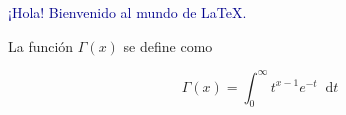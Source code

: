 \documentclass{article}
\newcommand*\diff{\mathop{}\!\mathrm{d}}
\begin{document}
\textcolor{DarkBlue}{¡Hola! Bienvenido al mundo de \LaTeX{}.}

\noindent
\begin{center}
La función $\Gamma(x)$ se define como
\end{center}

\[\boxed{\Gamma(x)=\int_{0}^{\infty}t^{x-1}e^{-t}\diff t}\]
\end{document}
